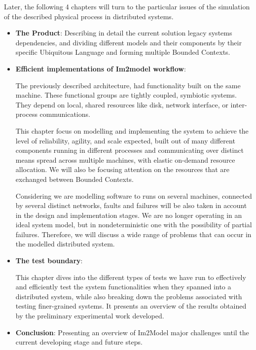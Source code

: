 \documentclass[
  oneside,
  11pt, a4paper,
  footinclude=true,
  headinclude=true,
  cleardoublepage=empty
]{scrbook}
\begin{document}
    Later, the following 4 chapters will turn to the particular issues of the simulation of the described physical process in distributed systems.
\begin{itemize}

    \item \textbf{The Product}:
    Describing in detail the current solution legacy systems dependencies, and dividing different models and their components by their specific Ubiquitous Language and forming multiple Bounded Contexts.\\
    

    
    \item \textbf{Efficient implementations of Im2model workflow}:
    
    
    The previously described architecture, had functionality built on the same machine. These functional groups are tightly coupled, symbiotic systems. They depend on local, shared resources like disk, network interface, or inter-process communications. \par

    This chapter focus on modelling and implementing the system to achieve the level of reliability, agility, and scale expected, built out of many different components running in different processes and communicating over distinct means spread across multiple machines, 
    with elastic \/ on-demand resource allocation. We will also be focusing attention on the resources that are exchanged between Bounded Contexts.\par
    Considering we are modelling software to runs on several machines, connected by several distinct networks, faults and failures will be also taken in account in the design and implementation stages. We are no longer operating in an ideal system model, but in nondeterministic one with the possibility of partial failures. Therefore, we will discuss a wide range of problems that can occur in the modelled distributed system.    \par

    
        \item \textbf{The test boundary}:  
        
        This chapter dives into the different types of tests we have run to effectively and efficiently test the system functionalities when they spanned into a distributed system, while also breaking down the problems associated with testing finer-grained systems. It presents an overview of the  results obtained by
the preliminary experimental work developed.

            \item \textbf{Conclusion}: Presenting an overview of  Im2Model major challenges until the current developing stage and future steps.


\end{itemize}
\end{document}
